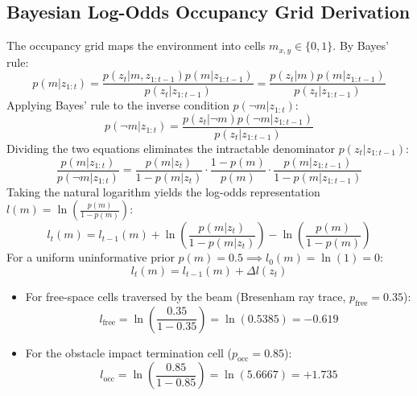 \documentclass[11pt, a4paper]{article}
\begin{document}
\subsection{Bayesian Log-Odds Occupancy Grid Derivation}
The occupancy grid maps the environment into cells $m_{x,y} \in \{0, 1\}$. By Bayes' rule:
\begin{equation}
    p(m | z_{1:t}) = \frac{p(z_t | m, z_{1:t-1}) p(m | z_{1:t-1})}{p(z_t | z_{1:t-1})} = \frac{p(z_t | m) p(m | z_{1:t-1})}{p(z_t | z_{1:t-1})}
\end{equation}
Applying Bayes' rule to the inverse condition $p(\neg m | z_{1:t})$:
\begin{equation}
    p(\neg m | z_{1:t}) = \frac{p(z_t | \neg m) p(\neg m | z_{1:t-1})}{p(z_t | z_{1:t-1})}
\end{equation}
Dividing the two equations eliminates the intractable denominator $p(z_t | z_{1:t-1})$:
\begin{equation}
    \frac{p(m | z_{1:t})}{p(\neg m | z_{1:t})} = \frac{p(m | z_t)}{1 - p(m | z_t)} \cdot \frac{1 - p(m)}{p(m)} \cdot \frac{p(m | z_{1:t-1})}{1 - p(m | z_{1:t-1})}
\end{equation}
Taking the natural logarithm yields the log-odds representation $l(m) = \ln\left(\frac{p(m)}{1 - p(m)}\right)$:
\begin{equation}
    l_t(m) = l_{t-1}(m) + \ln\left(\frac{p(m | z_t)}{1 - p(m | z_t)}\right) - \ln\left(\frac{p(m)}{1 - p(m)}\right)
\end{equation}
For a uniform uninformative prior $p(m) = 0.5 \implies l_0(m) = \ln(1) = 0$:
\begin{equation}
    l_t(m) = l_{t-1}(m) + \Delta l(z_t)
\end{equation}
\begin{itemize}
    \item For free-space cells traversed by the beam (Bresenham ray trace, $p_{\text{free}} = 0.35$):
    \begin{equation}
        l_{\text{free}} = \ln\left(\frac{0.35}{1 - 0.35}\right) = \ln(0.5385) = \mathbf{-0.619}
    \end{equation}
    \item For the obstacle impact termination cell ($p_{\text{occ}} = 0.85$):
    \begin{equation}
        l_{\text{occ}} = \ln\left(\frac{0.85}{1 - 0.85}\right) = \ln(5.6667) = \mathbf{+1.735}
    \end{equation}
\end{itemize}
\end{document}
